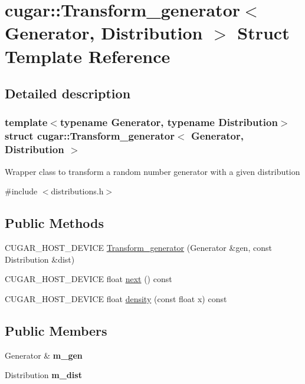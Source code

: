 \hypertarget{structcugar_1_1_transform__generator}{}\section{cugar\+:\+:Transform\+\_\+generator$<$ Generator, Distribution $>$ Struct Template Reference}
\label{structcugar_1_1_transform__generator}


\subsection{Detailed description}
\subsubsection*{template$<$typename Generator, typename Distribution$>$\newline
struct cugar\+::\+Transform\+\_\+generator$<$ Generator, Distribution $>$}

Wrapper class to transform a random number generator with a given distribution 

{\ttfamily \#include $<$distributions.\+h$>$}

\subsection*{Public Methods}
\begin{DoxyCompactItemize}
\item 
C\+U\+G\+A\+R\+\_\+\+H\+O\+S\+T\+\_\+\+D\+E\+V\+I\+CE \hyperlink{structcugar_1_1_transform__generator_a1ed65c84f620be6c7278948cb8ad92fc}{Transform\+\_\+generator} (Generator \&gen, const Distribution \&dist)
\item 
C\+U\+G\+A\+R\+\_\+\+H\+O\+S\+T\+\_\+\+D\+E\+V\+I\+CE float \hyperlink{structcugar_1_1_transform__generator_af61d4278e069e046a62a58c7d538ac22}{next} () const
\item 
C\+U\+G\+A\+R\+\_\+\+H\+O\+S\+T\+\_\+\+D\+E\+V\+I\+CE float \hyperlink{structcugar_1_1_transform__generator_a8bf089696f88138fba2636a6215adf33}{density} (const float x) const
\end{DoxyCompactItemize}
\subsection*{Public Members}
\begin{DoxyCompactItemize}
\item 
\mbox{\label{structcugar_1_1_transform__generator_a93c8f4589af565f5800a184cf5ec1356}} 
Generator \& {\bfseries m\+\_\+gen}
\item 
\mbox{\label{structcugar_1_1_transform__generator_a1800ec321ee7b08e7bd33f3b94f002f2}} 
Distribution {\bfseries m\+\_\+dist}
\end{DoxyCompactItemize}


